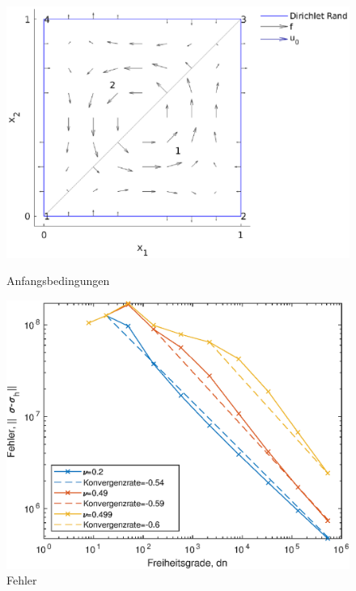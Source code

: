 \documentclass{scrartcl}
\begin{document}
\begin{figure}[h]
\centering
\begin{minipage}[t]{0.45\textwidth}
\centering
\includegraphics[width=\textwidth]{Plots/SquareBenchmarkInitial3}
\caption{Anfangsbedingungen}
\label{pl:SquareBenchmarkInitial}
\end{minipage}
\hfill
\begin{minipage}[t]{0.45\textwidth}
\centering
\includegraphics[width=\textwidth]{Plots/SquareBenchmarkNormSigDiff1}
\caption{Fehler}
\label{pl:SquareBenchmarkError}
\end{minipage}
\end{figure}
\end{document}

